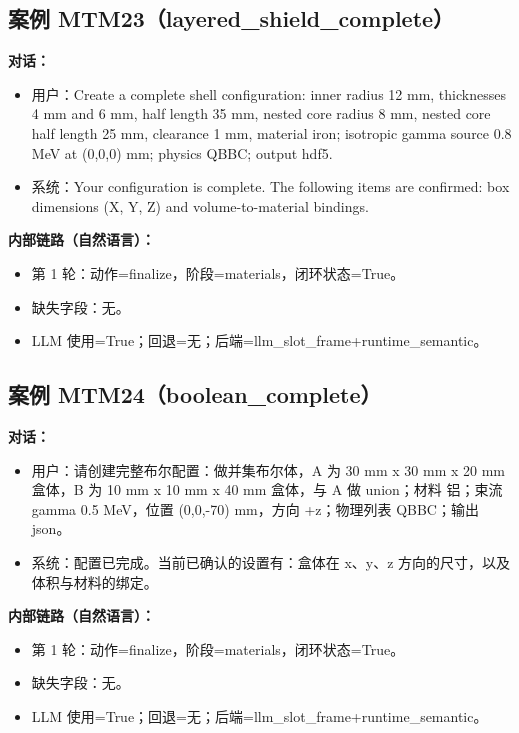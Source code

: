 \documentclass[11pt]{ctexart}
\begin{document}
\subsection{案例 MTM23（layered\_shield\_complete）}
\textbf{对话：}
\begin{itemize}
\item 用户：Create a complete shell configuration: inner radius 12 mm, thicknesses 4 mm and 6 mm, half length 35 mm, nested core radius 8 mm, nested core half length 25 mm, clearance 1 mm, material iron; isotropic gamma source 0.8 MeV at (0,0,0) mm; physics QBBC; output hdf5.
\item 系统：Your configuration is complete. The following items are confirmed: box dimensions (X, Y, Z) and volume-to-material bindings.
\end{itemize}
\textbf{内部链路（自然语言）：}
\begin{itemize}
\item 第 1 轮：动作=finalize，阶段=materials，闭环状态=True。
\item 缺失字段：无。
\item LLM 使用=True；回退=无；后端=llm\_slot\_frame+runtime\_semantic。
\end{itemize}
\subsection{案例 MTM24（boolean\_complete）}
\textbf{对话：}
\begin{itemize}
\item 用户：请创建完整布尔配置：做并集布尔体，A 为 30 mm x 30 mm x 20 mm 盒体，B 为 10 mm x 10 mm x 40 mm 盒体，与 A 做 union；材料 铝；束流 gamma 0.5 MeV，位置 (0,0,-70) mm，方向 +z；物理列表 QBBC；输出 json。
\item 系统：配置已完成。当前已确认的设置有：盒体在 x、y、z 方向的尺寸，以及体积与材料的绑定。
\end{itemize}
\textbf{内部链路（自然语言）：}
\begin{itemize}
\item 第 1 轮：动作=finalize，阶段=materials，闭环状态=True。
\item 缺失字段：无。
\item LLM 使用=True；回退=无；后端=llm\_slot\_frame+runtime\_semantic。
\end{itemize}
\end{document}
